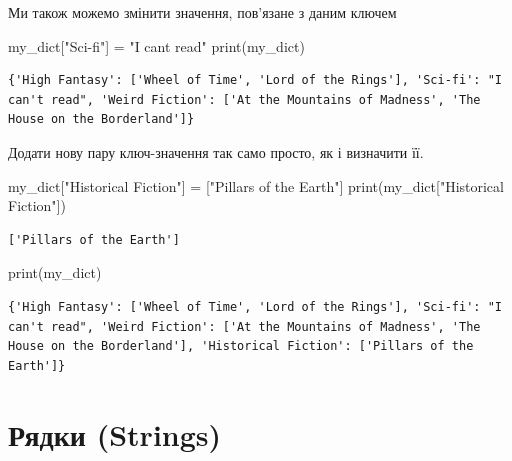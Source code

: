 \documentclass[
  letterpaper,
]{report}
\newenvironment{Shaded}{\begin{snugshade}}{\end{snugshade}}
\newcommand{\BuiltInTok}[1]{\textcolor[rgb]{0.00,0.23,0.31}{#1}}
\newcommand{\NormalTok}[1]{\textcolor[rgb]{0.00,0.23,0.31}{#1}}
\newcommand{\OperatorTok}[1]{\textcolor[rgb]{0.37,0.37,0.37}{#1}}
\newcommand{\StringTok}[1]{\textcolor[rgb]{0.13,0.47,0.30}{#1}}
\begin{document}
Ми також можемо змінити значення, пов'язане з даним ключем

\begin{Shaded}
\begin{Highlighting}[]
\NormalTok{my\_dict[}\StringTok{"Sci{-}fi"}\NormalTok{] }\OperatorTok{=} \StringTok{"I can\textquotesingle{}t read"}
\BuiltInTok{print}\NormalTok{(my\_dict)}
\end{Highlighting}
\end{Shaded}

\begin{verbatim}
{'High Fantasy': ['Wheel of Time', 'Lord of the Rings'], 'Sci-fi': "I can't read", 'Weird Fiction': ['At the Mountains of Madness', 'The House on the Borderland']}
\end{verbatim}

Додати нову пару ключ-значення так само просто, як і визначити її.

\begin{Shaded}
\begin{Highlighting}[]
\NormalTok{my\_dict[}\StringTok{"Historical Fiction"}\NormalTok{] }\OperatorTok{=}\NormalTok{ [}\StringTok{"Pillars of the Earth"}\NormalTok{]}
\BuiltInTok{print}\NormalTok{(my\_dict[}\StringTok{"Historical Fiction"}\NormalTok{])}
\end{Highlighting}
\end{Shaded}

\begin{verbatim}
['Pillars of the Earth']
\end{verbatim}

\begin{Shaded}
\begin{Highlighting}[]
\BuiltInTok{print}\NormalTok{(my\_dict)}
\end{Highlighting}
\end{Shaded}

\begin{verbatim}
{'High Fantasy': ['Wheel of Time', 'Lord of the Rings'], 'Sci-fi': "I can't read", 'Weird Fiction': ['At the Mountains of Madness', 'The House on the Borderland'], 'Historical Fiction': ['Pillars of the Earth']}
\end{verbatim}

\hypertarget{ux440ux44fux434ux43aux438-strings}{%
\section{Рядки (Strings)}\label{ux440ux44fux434ux43aux438-strings}}
\end{document}
